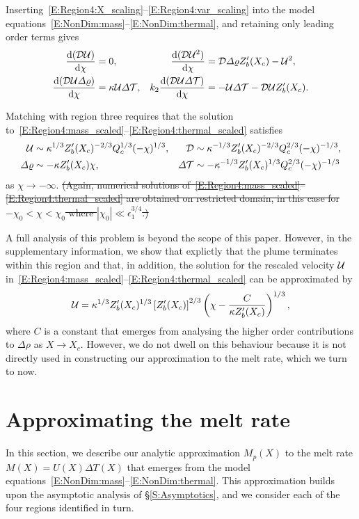 \documentclass[openacc]{rsproca_new}%
\newcommand{\dd}[2]{\frac{\mathrm{d} #1}{\mathrm{d} #2}}
\newcommand{\red}[1]{{\color{red} #1}}
\newcommand{\blue}[1]{{\color{blue} #1}}
\newcommand{\rout}[1]{\red{\st{#1}}}\newcommand{\ab}[1]{\textcolor{Green}{#1}}\newcommand{\about}[1]{\textcolor{Cyan}{\sout{#1}}}
\newcommand{\epsone}{\epsilon_{1}} %
\begin{document}
Inserting~\eqref{E:Region4:X_scaling}--\eqref{E:Region4:var_scaling} into the model equations~\eqref{E:NonDim:mass}--\eqref{E:NonDim:thermal}, and retaining only leading order terms gives
\begin{align}
\dd{(\D\U)}{\chi} &=0, &
\dd{(\D \U^2)}{\chi} &=  \D \p Z_b'(X_c) -\U^2,\label{E:Region4:mass_scaled}\\
\dd{(\D\U\p)}{\chi} &=\kappa  \U\t, &
k_2 \dd{(\D \U \t)}{\chi} &=- \U \t - \D \U Z_b'(X_c).\label{E:Region4:thermal_scaled}
\end{align}


Matching with region three requires that the solution to~\eqref{E:Region4:mass_scaled}--\eqref{E:Region4:thermal_scaled} satisfies
\begin{align}
\mathcal{U} &\sim \kappa^{1/3}Z_b'(X_c)^{-2/3}Q_c^{1/3} (-\chi)^{1/3}, &  \mathcal{D} &\sim \kappa^{-1/3} Z_b'(X_c)^{-2/3} Q_c^{2/3}(-\chi)^{-1/3}\label{E:Region4:far_field1},\\
\varDelta \varrho &\sim - \kappa Z_b'(X_c) \chi, & \varDelta \mathcal{T} &\sim -\kappa^{-1/3} Z_b'(X_c)^{1/3} Q_c^{2/3}(-\chi)^{-1/3}\label{E:Region4:far_field2}
\end{align}
as $\chi \to -\infty$. \rout{(Again, numerical solutions of~\eqref{E:Region4:mass_scaled}--\eqref{E:Region4:thermal_scaled} are obtained on restricted domain, in this case for $-\chi_0 < \chi < \chi_0$ where $|\chi_0| \ll \epsone^{3/4}$.)}

\blue{A full analysis of this problem is beyond the scope of this paper. However, in the supplementary information, we show that explictly that the plume terminates within this region and that, in addition, the solution for the rescaled velocity $\mathcal{U}$ in~\eqref{E:Region4:mass_scaled}--\eqref{E:Region4:thermal_scaled} can be approximated by} 
\begin{equation}
     \mathcal{U} =  \kappa^{1/3}Z_b'(X_c)^{1/3}\left[Z_b'(X_c)\right]^{2/3} \left(\chi - \frac{C}{\kappa Z_b'(X_c)}\right)^{1/3},
\end{equation}
\blue{where $C$ is a constant that emerges from analysing the higher order contributions to $\Delta \rho$ as $X \to X_c$. However, we do not dwell on this behaviour because it is not directly used in constructing our approximation to the melt rate, which we turn to now.}

\section{Approximating the melt rate}\label{S:MeltRate}
In this section, we describe our analytic approximation $M_p(X)$ to the melt rate $M(X) = U(X)\Delta T(X)$ that emerges from the model equations~\eqref{E:NonDim:mass}--\eqref{E:NonDim:thermal}. This approximation builds upon the asymptotic analysis of \S\ref{S:Asymptotics}, and we consider each of the four regions identified in turn. 
\end{document}
